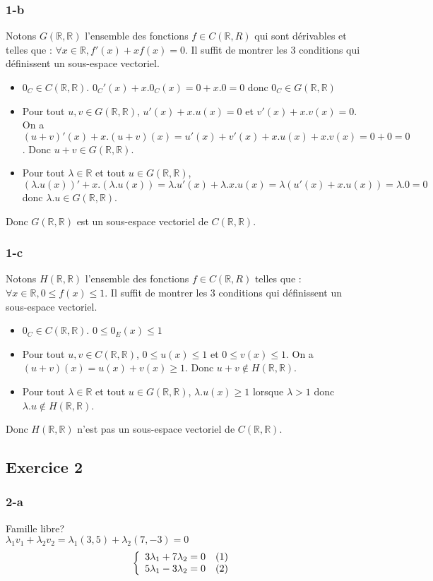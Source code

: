 \documentclass[]{book}
\theoremstyle{definition}
\newcommand{\bb}[1]{\mathbb{#1}}
\newcommand{\R}{\bb{R}}
\begin{document}
\subsubsection*{1-b}
Notons $G(\R,\R)$ l'ensemble des fonctions $f \in C(\R,R)$ qui sont d\'erivables et telles que : $\forall x \in \R, f'(x)+xf(x) = 0$.
Il suffit de montrer les 3 conditions qui d\'efinissent un sous-espace vectoriel.
\begin{itemize}
\item $0_C \in C(\R,\R)$. $0_C'(x) + x.0_C(x) = 0 + x.0 = 0$ donc $0_C \in G(\R,\R)$ 
\item Pour tout $u, v \in G(\R,\R)$, $u'(x) + x.u(x) = 0$ et $v'(x)+x.v(x) = 0$. On a $(u+v)'(x) + x.(u+v)(x) = u'(x) + v'(x) + x.u(x) + x.v(x) = 0 + 0 = 0$. Donc  $u+v \in G(\R,\R)$.
\item Pour tout $\lambda \in \R$ et tout $u \in G(\R,\R)$, $(\lambda.u(x))'+x.(\lambda.u(x)) = \lambda.u'(x) + \lambda.x.u(x) = \lambda (u'(x) + x.u(x)) = \lambda.0 = 0$ donc $\lambda.u \in G(\R,\R)$.
\end{itemize}
Donc $G(\R,\R)$ est un sous-espace vectoriel de $C(\R,\R)$.

\subsubsection*{1-c}
Notons $H(\R,\R)$ l'ensemble des fonctions $f \in C(\R,R)$ telles que : $\forall x \in \R, 0 \leq f(x) \leq 1$.
Il suffit de montrer les 3 conditions qui d\'efinissent un sous-espace vectoriel.
\begin{itemize}
\item $0_C \in C(\R,\R)$. $0 \leq 0_E(x) \leq 1$
\item Pour tout $u, v \in C(\R,\R)$, $0 \leq u(x) \leq 1$ et $0 \leq v(x) \leq 1$. On a $(u+v)(x) = u(x) + v(x) \geq 1$. Donc  $u+v \notin H(\R,\R)$.
\item Pour tout $\lambda \in \R$ et tout $u \in G(\R,\R)$, $\lambda.u(x) \geq 1$ lorsque $\lambda > 1$ donc $\lambda.u \notin H(\R,\R)$.
\end{itemize}
Donc $H(\R,\R)$ n'est pas un sous-espace vectoriel de $C(\R,\R)$.


\subsection*{Exercice 2}
\subsubsection*{2-a}
Famille libre? \\
$\lambda_1 v_1 + \lambda_2 v_2 = \lambda_1 (3,5) + \lambda_2 (7,-3) = 0$
$$
\left\{ 
\begin{array}{l l}
3 \lambda_1 + 7 \lambda_2 = 0 & (1)\\
5 \lambda_1 - 3 \lambda_2 = 0 & (2)\\
\end{array}
\right. 
$$ 
\end{document}
